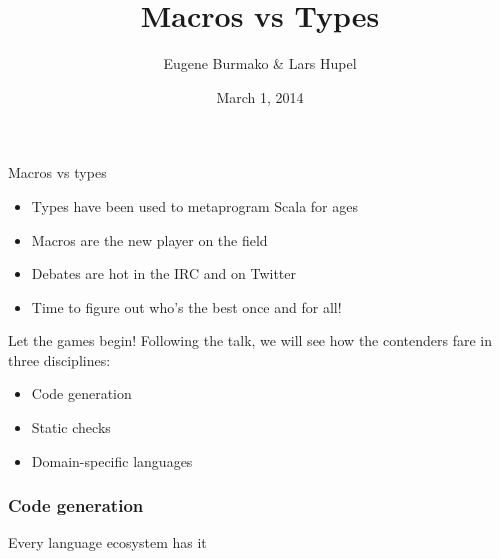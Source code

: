 \documentclass{beamer}
\begin{document}
  \title{Macros vs Types}
  \author{Eugene Burmako \& Lars Hupel}
  \date{March 1, 2014}

{
\begin{frame}
  \titlepage
\end{frame}
}

\begin{frame}{Macros vs types}
  \begin{itemize}
  \item Types have been used to metaprogram Scala for ages
  \item Macros are the new player on the field
  \item Debates are hot in the IRC and on Twitter
  \item Time to figure out who's the best once and for all!
  \end{itemize}
\end{frame}

\begin{frame}{Let the games begin!}
  Following the  talk, we will see how the contenders fare in three disciplines:

  \vspace{1em}
  \begin{itemize}
  \item Code generation
  \item Static checks
  \item Domain-specific languages
  \end{itemize}
\end{frame}

\begin{frame}
\vskip40pt
\begin{center}
\end{center}
\end{frame}

\begin{frame}[fragile]
\frametitle{Code generation}
  Every language ecosystem has it
\end{frame}
\end{document}
